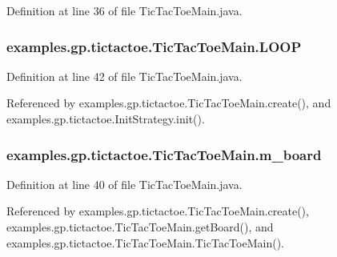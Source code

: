 Definition at line 36 of file Tic\-Tac\-Toe\-Main.\-java.

\hypertarget{classexamples_1_1gp_1_1tictactoe_1_1_tic_tac_toe_main_a05c90d04b5032bed2b3387498fca3a3a}{
\subsubsection[{L\-O\-O\-P}]{ examples.\-gp.\-tictactoe.\-Tic\-Tac\-Toe\-Main.\-L\-O\-O\-P\hspace{0.3cm}{\ttfamily [static]}}}\label{classexamples_1_1gp_1_1tictactoe_1_1_tic_tac_toe_main_a05c90d04b5032bed2b3387498fca3a3a}


Definition at line 42 of file Tic\-Tac\-Toe\-Main.\-java.



Referenced by examples.\-gp.\-tictactoe.\-Tic\-Tac\-Toe\-Main.\-create(), and examples.\-gp.\-tictactoe.\-Init\-Strategy.\-init().

\hypertarget{classexamples_1_1gp_1_1tictactoe_1_1_tic_tac_toe_main_adc3305d58fa2343346180dde941852d9}{
\subsubsection[{m\-\_\-board}]{ examples.\-gp.\-tictactoe.\-Tic\-Tac\-Toe\-Main.\-m\-\_\-board\hspace{0.3cm}{\ttfamily [private]}}}\label{classexamples_1_1gp_1_1tictactoe_1_1_tic_tac_toe_main_adc3305d58fa2343346180dde941852d9}


Definition at line 40 of file Tic\-Tac\-Toe\-Main.\-java.



Referenced by examples.\-gp.\-tictactoe.\-Tic\-Tac\-Toe\-Main.\-create(), examples.\-gp.\-tictactoe.\-Tic\-Tac\-Toe\-Main.\-get\-Board(), and examples.\-gp.\-tictactoe.\-Tic\-Tac\-Toe\-Main.\-Tic\-Tac\-Toe\-Main().

